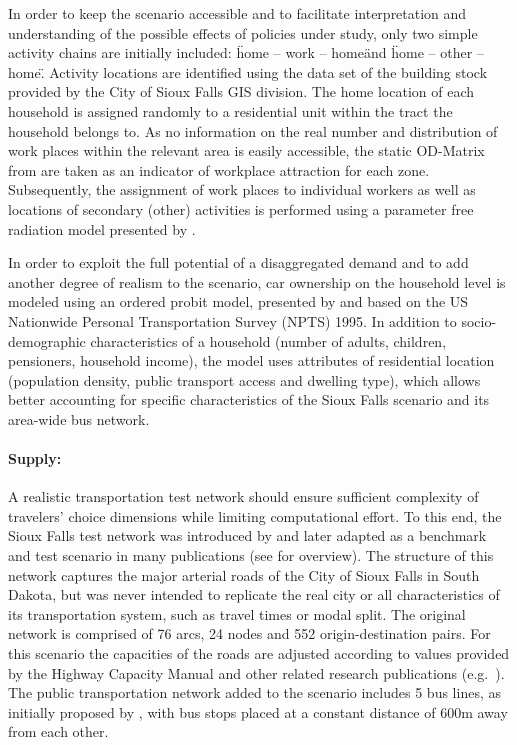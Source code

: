 In order to keep the scenario accessible and to facilitate interpretation and understanding of the possible effects of policies under study, only two simple activity chains are initially included: \"home – work – home\" and \"home – other – home\". Activity locations are identified using the data set of the building stock provided by the City of Sioux Falls GIS division. The home location of each household is assigned randomly to a residential unit within the tract the household belongs to. As no information on the real number and distribution of work places within the relevant area is easily accessible, the static OD-Matrix from \citet[][]{LeBlancEtAl_TransRes_1975} are taken as an indicator of workplace attraction for each zone. Subsequently, the assignment of work places to individual workers as well as locations of secondary (other) activities is performed using a parameter free radiation model presented by \citet[][]{SiminiEtAl_NAT_2012}.

In order to exploit the full potential of a disaggregated demand and to add another degree of realism to the scenario, car ownership on the household level is modeled using an ordered probit model, presented by \citet[][]{GiulianoDargay_TransResA_2006} and based on the US Nationwide Personal Transportation Survey (NPTS) 1995. In addition to socio-demographic characteristics of a household (number of adults, children, pensioners, household income), the model uses attributes of residential location (population density, public transport access and dwelling type), which allows better accounting for specific characteristics of the Sioux Falls scenario and its area-wide bus network. 

\paragraph{Supply:} 

A realistic transportation test network should ensure sufficient complexity of travelers’ choice dimensions while limiting  computational effort. To this end, the Sioux Falls test network was introduced by \citet[][]{MorlokEtAl_ResRep_org-fhwa_1973} and later adapted as a benchmark and test scenario in many publications (see \citet[][]{ChakirovFourie_TechRep_FCL_2014} for overview). The structure of this network captures the major arterial roads of the City of Sioux Falls in South Dakota, but was never intended to replicate the real city or all characteristics of its transportation system, such as travel times or modal split. The original network is comprised of 76 arcs, 24 nodes and 552 origin-destination pairs. For this scenario the capacities of the roads are adjusted according to values provided by the Highway Capacity Manual \citet[][]{HCM_2010} and other related research publications (e.g.\ \citet[][]{NgCFSmall_Transportation_2012}). The public transportation network added to the scenario includes 5 bus lines, as initially proposed by \citet[][]{AbdulaalLeBlanc_TransScience_1979}, with bus stops placed at a constant distance of 600m away from each other. 

